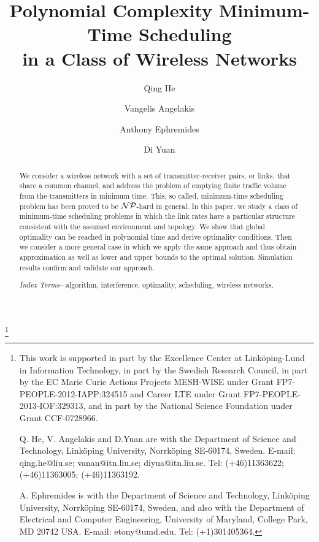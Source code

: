 \documentclass[10pt,onecolumn,journal,draftcls,oneside]{IEEEtran}
\newcounter{cond}
\begin{document}
\title{{\huge Polynomial Complexity Minimum-Time Scheduling \\ in a Class of Wireless Networks}}



\author[]{Qing He}
\author[1]{Vangelis Angelakis}
\author[1,2]{Anthony Ephremides}
\author[1]{Di Yuan}
\maketitle

\begin{abstract}

We consider a wireless network with a set of transmitter-receiver pairs, or links, that share a common channel, and address the problem of emptying finite traffic volume from the transmitters in minimum time. This, so called, minimum-time scheduling problem has been proved to be ${\cal NP}$-hard in general. In this paper, we study a class of minimum-time scheduling problems in which the link rates have a particular structure consistent with the assumed environment and topology. We show that global optimality can be reached in polynomial time and derive optimality conditions. Then we consider a more general case in which we apply the same approach and thus obtain approximation as well as lower and upper bounds to the optimal solution. Simulation results confirm and validate our approach.

\emph{Index Terms--} algorithm, interference, optimality, scheduling, wireless networks.



\end{abstract}

\let\thefootnote\relax\footnote 
{This work is supported in part by the Excellence Center at Link{\"o}ping-Lund in Information Technology, in part by the Swedish Research Council, in part by the EC Marie Curie Actions Projects MESH-WISE under Grant FP7-PEOPLE-2012-IAPP:324515 and Career LTE under Grant FP7-PEOPLE-2013-IOF:329313, and in part by the National Science Foundation under Grant CCF-0728966.

Q. He, V. Angelakis and D.Yuan are with the Department of Science and Technology, Link{\"o}ping University, Norrk{\"o}ping SE-60174, Sweden. E-mail: qing.he@liu.se; vanan@itn.liu.se; diyua@itn.liu.se. Tel: (+46)11363622; (+46)11363005; (+46)11363192.

A. Ephremides is with the Department of Science and Technology, Link{\"o}ping University, Norrk{\"o}ping SE-60174, Sweden, and also with the Department of Electrical and Computer Engineering, University of Maryland, College Park, MD 20742 USA. E-mail: etony@umd.edu. Tel: (+1)301405364.}
\end{document}
